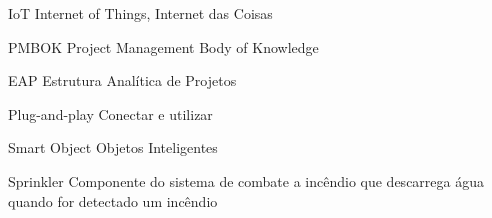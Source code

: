 \begin{siglas}
  \item[IoT] Internet of Things, Internet das Coisas
  \item[PMBOK] Project Management Body of Knowledge
  \item[EAP] Estrutura Analítica de Projetos
  \item[Plug-and-play] Conectar e utilizar
  \item[Smart Object] Objetos Inteligentes
  \item[Sprinkler] Componente do sistema de combate a incêndio que descarrega água quando for detectado um incêndio
\end{siglas}